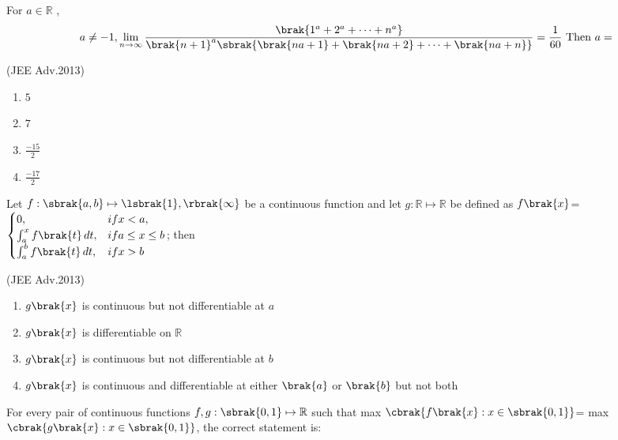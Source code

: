     \item 
	    For $a\in \mathbb{R}$ , 
    \begin{align*}
	    a\neq -1, \lim_{n\to\infty}\frac{\brak{1^a+2^a+\cdots+n^a}}{\brak{n+1}^a\sbrak{\brak{na+1}+\brak{na+2}+\cdots+\brak{na+n}}}
	    =\frac{1}{60} \text{ Then } a=
    \end{align*}

    \hfill(JEE Adv.2013)
    
    \begin{multicols}{4}
    \begin{enumerate}
        \item $5$
        \item $7$ 
        \item $\frac{-15}{2}$ 
        \item $\frac{-17}{2}$ 
    \end{enumerate}
    \end{multicols}


    \item 
    Let $f: \sbrak{a,b}\mapsto \lsbrak{1},\rbrak{\infty}$ be a continuous function and let $g: \mathbb{R}\mapsto \mathbb{R}$ be defined as 
    $f\brak{x}$= 
    $\begin{cases}
       0, & if x<a, \\
       \int_{a}^{x}{f\brak{t} \, dt}, & if a\leq x\leq b \\
       \int_{a}^{b}{f\brak{t} \, dt}, & if x>b
    \end{cases}$; then 

    \hfill(JEE Adv.2013)
    
    \begin{enumerate}
        \item $g\brak{x}$ is continuous but not differentiable at $a$
        \item $g\brak{x}$ is differentiable on $\mathbb{R}$
        \item $g\brak{x}$ is continuous but not differentiable at $b$
        \item $g\brak{x}$ is continuous and differentiable at either $\brak{a}$ or $\brak{b}$ but not both 
    \end{enumerate}


    \item 
	  For every pair of continuous functions $f, g: \sbrak{0, 1}\mapsto \mathbb{R}$ such that max $\cbrak{f\brak{x}: x\in \sbrak{0, 1}}$= max $\cbrak{g\brak{x}: x\in \sbrak{0, 1}}$, the correct statement is: 
    
